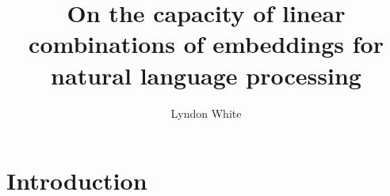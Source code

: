 \documentclass{book}
\title{On the capacity of linear combinations of embeddings for natural language processing}
\author{Lyndon White}
\begin{document}
\maketitle
\tableofcontents


\chapter{Introduction}






\end{document}
